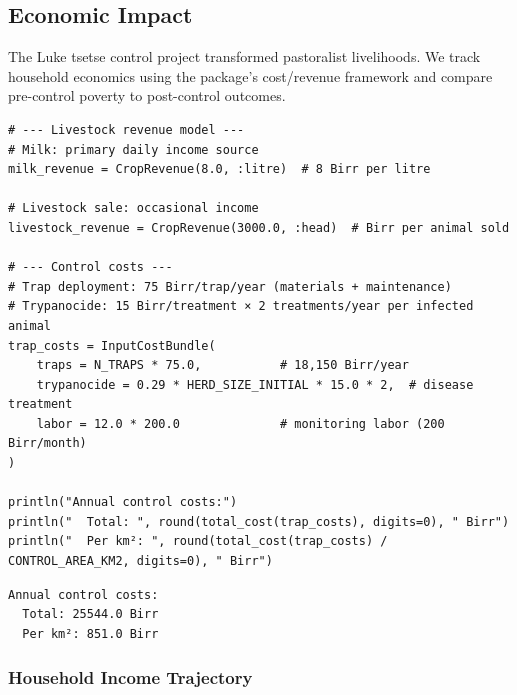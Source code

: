 \subsection{Economic Impact}



\label{9141184955169484520}{}


The Luke tsetse control project transformed pastoralist livelihoods. We track household economics using the package’s cost/revenue framework and compare pre-control poverty to post-control outcomes.




\begin{verbatim}
# --- Livestock revenue model ---
# Milk: primary daily income source
milk_revenue = CropRevenue(8.0, :litre)  # 8 Birr per litre

# Livestock sale: occasional income
livestock_revenue = CropRevenue(3000.0, :head)  # Birr per animal sold

# --- Control costs ---
# Trap deployment: 75 Birr/trap/year (materials + maintenance)
# Trypanocide: 15 Birr/treatment × 2 treatments/year per infected animal
trap_costs = InputCostBundle(
    traps = N_TRAPS * 75.0,           # 18,150 Birr/year
    trypanocide = 0.29 * HERD_SIZE_INITIAL * 15.0 * 2,  # disease treatment
    labor = 12.0 * 200.0              # monitoring labor (200 Birr/month)
)

println("Annual control costs:")
println("  Total: ", round(total_cost(trap_costs), digits=0), " Birr")
println("  Per km²: ", round(total_cost(trap_costs) / CONTROL_AREA_KM2, digits=0), " Birr")
\end{verbatim}




\begin{verbatim}
Annual control costs:
  Total: 25544.0 Birr
  Per km²: 851.0 Birr
\end{verbatim}



\subsubsection{Household Income Trajectory}



\label{17475266338454749806}{}



